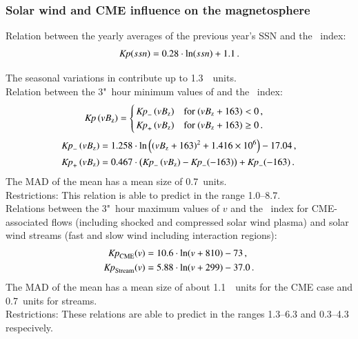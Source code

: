 \subsubsection*{Solar wind and CME influence on the magnetosphere}

Relation between the yearly averages of the previous year's SSN and the \Kp~index:
\begin{align}
	\textit{Kp}(ssn) = 0.28 \cdot \ln(ssn) + 1.1	\,.
\end{align}

The seasonal variations in \Kp{} contribute up to 1.3~\Kp~units.\\

Relation between the 3"~hour minimum values of \vBz{} and the \Kp~index:
\begin{align*}
	\text{\textit{Kp}}\left(vB_\text{z}\right) &=
	\begin{cases}
		\,\text{\textit{Kp}}_-\left(vB_\text{z}\right) &\text{for } (vB_\text{z} + 163) < 0	\,,\\
		\,\text{\textit{Kp}}_+\left(vB_\text{z}\right) &\text{for } (vB_\text{z} + 163) \ge 0	\,.
	\end{cases}
\end{align*}
\begin{align*}
	\text{\textit{Kp}}_-\left(vB_\text{z}\right) &= 1.258 \cdot \ln\left(\left(vB_\text{z} + 163\right)^2 + \num{1.416e6}\right) - 17.04	\,,\\
	\text{\textit{Kp}}_+\left(vB_\text{z}\right) &= 0.467 \cdot \left(\text{\textit{Kp}}_-\left(vB_\text{z}\right) - \text{\textit{Kp}}_-(-163)\right) + \text{\textit{Kp}}_-(-163)	\,.
\end{align*}
The MAD of the mean has a mean size of \SI{0.7}{\Kp}~units.\\
Restrictions: This relation is able to predict \Kp{} in the range \numrange{1.0}{8.7}.\\

Relations between the 3"~hour maximum values of $v$ and the \Kp~index for CME-associated flows (including shocked and compressed solar wind plasma) and solar wind streams (fast and slow wind including interaction regions):
\begin{align*}
	\text{\textit{Kp}}_\text{CME}(v) &= 10.6 \cdot \ln(v + 810) - 73	\,,\\
	\text{\textit{Kp}}_\text{Stream}(v) &= 5.88 \cdot \ln(v + 299) - 37.0	\,.
\end{align*}
The MAD of the mean has a mean size of about \SI{1.1}{\Kp~units} for the CME case and \SI{0.7}{\Kp}~units for streams.\\
Restrictions: These relations are able to predict \Kp{} in the ranges \numrange{1.3}{6.3} and \numrange{0.3}{4.3} respecively.\\


